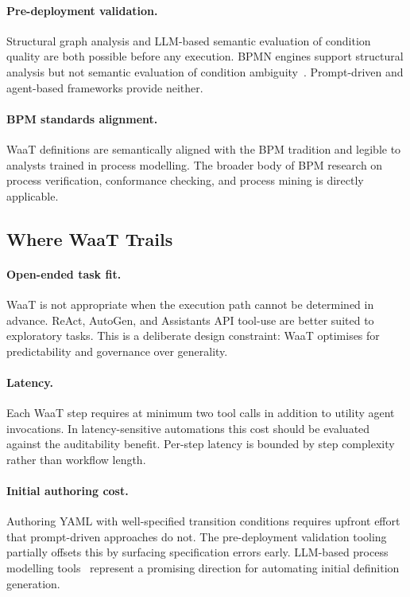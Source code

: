 \documentclass[10pt,conference]{IEEEtran}
\begin{document}
\paragraph{Pre-deployment validation.}
Structural graph analysis and LLM-based semantic evaluation of
condition quality are both possible before any execution.  BPMN
engines support structural analysis but not semantic evaluation of
condition ambiguity~\cite{vidgof2023bpm}.  Prompt-driven and
agent-based frameworks provide neither.

\paragraph{BPM standards alignment.}
WaaT definitions are semantically aligned with the BPM tradition
and legible to analysts trained in process modelling.  The broader
body of BPM research on process verification, conformance
checking, and process mining is directly applicable.

\subsection{Where WaaT Trails}

\paragraph{Open-ended task fit.}
WaaT is not appropriate when the execution path cannot be
determined in advance.  ReAct, AutoGen, and Assistants API
tool-use are better suited to exploratory tasks.  This is a
deliberate design constraint: WaaT optimises for predictability
and governance over generality.

\paragraph{Latency.}
Each WaaT step requires at minimum two tool calls in addition to
utility agent invocations.  In latency-sensitive automations this
cost should be evaluated against the auditability benefit.
Per-step latency is bounded by step complexity rather than
workflow length.

\paragraph{Initial authoring cost.}
Authoring YAML with well-specified transition conditions requires
upfront effort that prompt-driven approaches do not.
The pre-deployment validation tooling partially offsets this by
surfacing specification errors early.  LLM-based process modelling
tools~\cite{kourani2024promoai} represent a promising direction
for automating initial definition generation.
\end{document}
